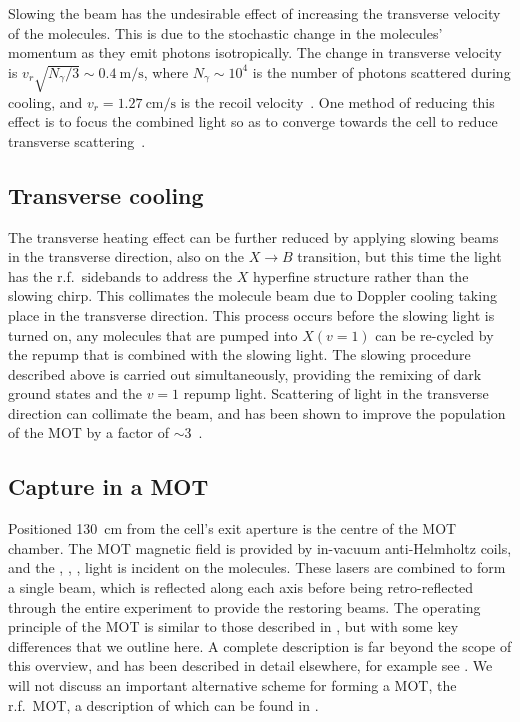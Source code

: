 Slowing the beam has the undesirable effect of increasing the transverse
velocity of the molecules. This is due to the stochastic change in the
molecules' momentum as they emit photons isotropically. The change in
transverse velocity is $v_r\sqrt{N_\gamma/3}\sim\SI{0.4}{\meter\per\second}$,
where $N_\gamma \sim 10^4$ is the number of photons scattered during cooling,
and $v_r=\SI{1.27}{\centi\meter\per\second}$ is the recoil
velocity~\cite{Jurgilas2021}.  One method of reducing this effect is to focus
the combined light so as to converge towards the cell to reduce transverse
scattering~\cite{Truppe2017a}.

\subsection*{Transverse cooling}

The transverse heating effect can be further reduced by applying slowing beams
in the transverse direction, also on the $X\rightarrow B$ transition, but this
time the light has the r.f.\ sidebands to address the $X$ hyperfine structure
rather than the slowing chirp. This collimates the molecule beam due to
Doppler cooling taking place in the transverse direction. This process occurs before the slowing light is
turned on, any molecules that are pumped into $X(v=1)$ can be re-cycled by the
 repump that is combined with the slowing light. The slowing procedure described above is carried
out simultaneously, providing the remixing of dark ground states and the $v=1$
repump light.
%
Scattering of light in the transverse direction can collimate the beam, and has
been shown to improve the population of the MOT by a factor of
$\sim3$~\cite{Jurgilas2021}.

\subsection*{Capture in a MOT}

Positioned \SI{130}{\centi\meter} from the cell's exit aperture is the centre
of the MOT chamber. The MOT magnetic field is provided by in-vacuum
anti-Helmholtz coils, and the , , ,
 light is incident on the molecules. These lasers are combined to
form a single beam, which is reflected along each axis before being
retro-reflected through the entire experiment to provide the restoring beams.
%
The operating principle of the \CaF{} MOT is similar to those described in
, but with some key differences that we outline here.
A complete description is far beyond the scope of this overview, and has been
described in detail elsewhere, for example see .  We
will not discuss an important alternative scheme for forming a \CaF{} MOT, the
r.f.\ MOT, a description of which can be found in
.

